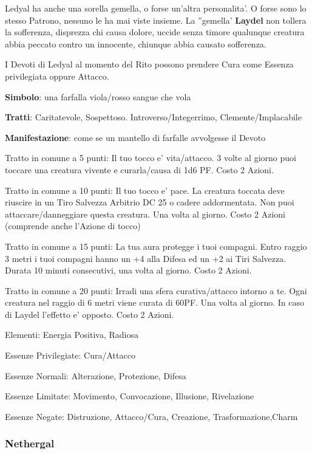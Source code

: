 \documentclass[a4paper,11pt,twoside,openany]{book}
\begin{document}
{		Ledyal ha anche una sorella gemella, o forse un'altra personalita'. O forse sono lo stesso Patrono, nessuno le ha mai viste insieme. La ''gemella' \textbf{Laydel} non tollera la sofferenza, disprezza chi causa dolore, uccide senza timore qualunque creatura abbia peccato contro un innocente, chiunque abbia causato sofferenza.
		
		I Devoti di Ledyal al momento del Rito possono prendere Cura come Essenza privilegiata oppure Attacco.
		
		\textbf{Simbolo}: una farfalla viola/rosso sangue che vola
		
		\textbf{Tratti}: Caritatevole, Sospettoso. Introverso/Integerrimo, Clemente/Implacabile
		
		\textbf{Manifestazione}: come se un mantello di farfalle avvolgesse il Devoto
		
		\bigskip
		
		Tratto in comune a 5 punti: Il tuo tocco e' vita/attacco. 3 volte al giorno puoi toccare una creatura vivente e curarla/causa di 1d6 PF. Costo 2 Azioni.
		
		Tratto in comune a 10 punti: Il tuo tocco e' pace. La creatura toccata deve riuscire in un Tiro Salvezza Arbitrio DC 25 o cadere addormentata. Non puoi attaccare/danneggiare questa creatura. Una volta al giorno. Costo 2 Azioni (comprende anche l'Azione di tocco)
		
		Tratto in comune a 15 punti: La tua aura protegge i tuoi compagni. Entro raggio 3 metri i tuoi compagni hanno un +4 alla Difesa ed un +2 ai Tiri Salvezza. Durata 10 minuti consecutivi, una volta al giorno. Costo 2 Azioni.
		
		Tratto in comune a 20 punti: Irradi una sfera curativa/attacco intorno a te. Ogni creatura nel raggio di 6 metri viene curata di 60PF. Una volta al giorno. In caso di Laydel l'effetto e' opposto. Costo 2 Azioni.
		
		\bigskip
		
		Elementi: Energia Positiva, Radiosa
		
		\bigskip
		
		Essenze Privilegiate: Cura/Attacco
		
		Essenze Normali: Alterazione, Protezione, Difesa
		
		Essenze Limitate: Movimento, Convocazione, Illusione, Rivelazione
		
		Essenze Negate: Distruzione, Attacco/Cura, Creazione, Trasformazione,Charm
		
		\subsubsection{Nethergal}
		
}
\end{document}
